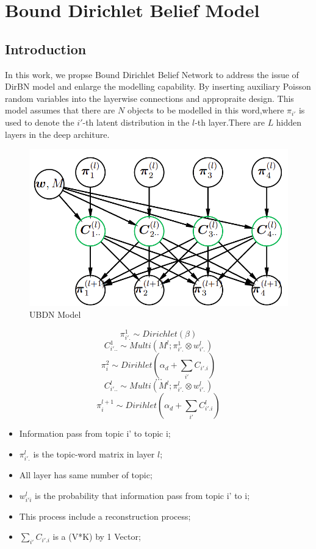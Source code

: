 \chapter{Bound Dirichlet Belief Model}\label{ccl}

\section{Introduction}
In this work, we propse Bound Dirichlet Belief Network to address the issue of DirBN model and enlarge the modelling capability. By inserting auxiliary Poisson random variables into the  layerwise connections and appropraite design. This model assumes that there are $N$ objects to be modelled in this word,where $\pi_{i'}$ is used to denote the $i'$-th latent distribution in the $l$-th layer.There are $L$ hidden layers in the deep architure.


\begin{figure}
\includegraphics[width = \linewidth]{ubdn.png}
\caption{UBDN Model}
\label{fig:DirBN Model}
\end{figure}

$$ \pi_{i'.}^1 \sim Dirichlet(\beta) $$
$$C_{i'..}^{1} \sim Multi(M^l;\pi_{i'.}^1 \otimes w_{i'.}^l) \tag{1}$$
$$\pi_{i}^{2} \sim Dirihlet(\alpha_d +\sum_{i'}{C_{i'.i}})\tag{2}$$
$$\dots$$
$$C_{i'..}^{l} \sim Multi(M^l;\pi_{i'.}^l \otimes w_{i'.}^l) \tag{1}$$
$$\pi_{i}^{l+1} \sim Dirihlet(\alpha_d +\sum_{i'}{C_{i'.i}^l})\tag{2}$$
\begin{itemize}
  \item Information pass from topic i' to topic i;
  \item $\pi_{i'.}^l$ is the topic-word matrix in layer $l$;
  \item All layer has same number of topic;
  \item $w_{i'i}^l$ is the probability that information pass from topic i' to i;
  \item This process include a reconstruction process;
  \item  $\sum_{i'}{C_{i'.i}}$  is a (V*K) by 1 Vector;
\end{itemize}

